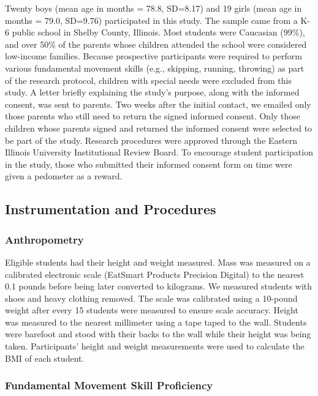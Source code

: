 \documentclass[
  jou,
  colorlinks=true,linkcolor=blue,citecolor=blue,urlcolor=blue]{apa7}
\begin{document}
Twenty boys (mean age in months = 78.8, SD=8.17) and 19 girls (mean age
in months = 79.0, SD=9.76) participated in this study. The sample came
from a K-6 public school in Shelby County, Illinois. Most students were
Caucasian (99\%), and over 50\% of the parents whose children attended
the school were considered low-income families. Because prospective
participants were required to perform various fundamental movement
skills (e.g., skipping, running, throwing) as part of the research
protocol, children with special needs were excluded from this study. A
letter briefly explaining the study's purpose, along with the informed
consent, was sent to parents. Two weeks after the initial contact, we
emailed only those parents who still need to return the signed informed
consent. Only those children whose parents signed and returned the
informed consent were selected to be part of the study. Research
procedures were approved through the Eastern Illinois University
Institutional Review Board. To encourage student participation in the
study, those who submitted their informed consent form on time were
given a pedometer as a reward.

\hypertarget{instrumentation-and-procedures}{%
\subsection{Instrumentation and
Procedures}\label{instrumentation-and-procedures}}

\hypertarget{anthropometry}{%
\subsubsection{Anthropometry}\label{anthropometry}}

Eligible students had their height and weight measured. Mass was
measured on a calibrated electronic scale (EatSmart Products Precision
Digital) to the nearest 0.1 pounds before being later converted to
kilograms. We measured students with shoes and heavy clothing removed.
The scale was calibrated using a 10-pound weight after every 15 students
were measured to ensure scale accuracy. Height was measured to the
nearest millimeter using a tape taped to the wall. Students were
barefoot and stood with their backs to the wall while their height was
being taken. Participants' height and weight measurements were used to
calculate the BMI of each student.

\hypertarget{fundamental-movement-skill-proficiency}{%
\subsubsection{Fundamental Movement Skill
Proficiency}\label{fundamental-movement-skill-proficiency}}
\end{document}
